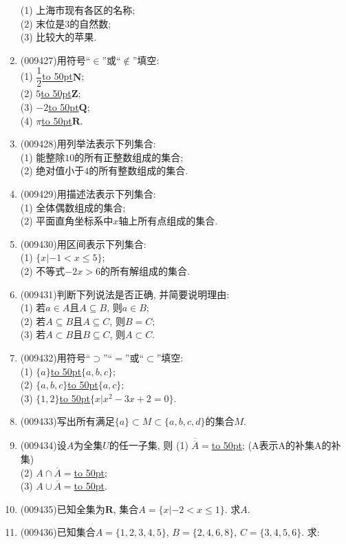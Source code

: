 \documentclass[10pt,a4paper]{article}
\newcommand{\blank}[1]{\underline{\hbox to #1pt{}}}
\begin{document}
\begin{enumerate}[1.]
(1) 上海市现有各区的名称;\\
(2) 末位是$3$的自然数;\\
(3) 比较大的苹果.
\item {\tiny (009427)}用符号``$\in$''或``$\not\in$''填空:\\
(1) $\dfrac12$\blank{50}$\mathbf{N}$;\\
(2) $5$\blank{50}$\mathbf{Z}$;\\
(3) $-2$\blank{50}$\mathbf{Q}$;\\
(4) $\pi$\blank{50}$\mathbf{R}$.
\item {\tiny (009428)}用列举法表示下列集合:\\
(1) 能整除$10$的所有正整数组成的集合;\\
(2) 绝对值小于$4$的所有整数组成的集合.
\item {\tiny (009429)}用描述法表示下列集合:\\
(1) 全体偶数组成的集合;\\
(2) 平面直角坐标系中$x$轴上所有点组成的集合.
\item {\tiny (009430)}用区间表示下列集合:\\
(1) $\{x|-1<x\le 5\}$;\\
(2) 不等式$-2x>6$的所有解组成的集合.
\item {\tiny (009431)}判断下列说法是否正确, 并简要说明理由:\\
(1) 若$a\in A$且$A\subseteq B$, 则$a\in B$;\\
(2) 若$A\subseteq B$且$A\subseteq C$, 则$B=C$;\\
(3) 若$A\subset B$且$B\subseteq C$, 则$A\subset C$.
\item {\tiny (009432)}用符号``$\supset$''``$=$''或``$\subset$''填空:\\
(1) $\{a\}$\blank{50}$\{a, b, c\}$;\\
(2) $\{a, b, c\}$\blank{50}$\{a, c\}$;\\
(3) $\{1, 2\}$\blank{50}$\{x|x^2-3x+2=0\}$.
\item {\tiny (009433)}写出所有满足$\{a\}\subset M\subset \{a, b, c, d\}$的集合$M$.
\item {\tiny (009434)}设$A$为全集$U$的任一子集, 则
(1) $\overline{\overline{A}}=$\blank{50}; (A表示A的补集A的补集)\\
(2) $A\cap \overline A=$\blank{50};\\
(3) $A\cup \overline A=$\blank{50}.
\item {\tiny (009435)}已知全集为$\mathbf{R}$, 集合$A=\{x|-2<x\le 1\}$. 求$A$.
\item {\tiny (009436)}已知集合$A=\{1, 2, 3, 4, 5\}$, $B=\{2, 4, 6, 8\}$, $C=\{3, 4, 5, 6\}$. 求:\\

\end{enumerate}
\end{document}
